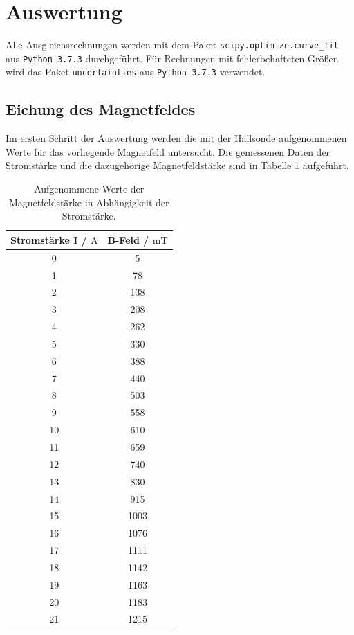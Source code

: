 \section{Auswertung}
Alle Ausgleichsrechnungen werden mit dem Paket \texttt{scipy.optimize.curve\_fit}  aus \texttt{Python 3.7.3} durchgeführt.
Für Rechnungen mit fehlerbehafteten Größen wird das Paket \texttt{uncertainties} aus \texttt{Python 3.7.3} verwendet.

\subsection{Eichung des Magnetfeldes}
Im ersten Schritt der Auswertung werden die mit der Hallsonde aufgenommenen Werte für das
vorliegende Magnetfeld untersucht. Die gemessenen Daten der Stromstärke und die dazugehörige
Magnetfeldstärke sind in Tabelle \ref{Tab:Messwerte} aufgeführt.
\begin{table}[H]
    \centering
    \caption{Aufgenommene Werte der Magnetfeldstärke in Abhängigkeit der Stromstärke.}
    \label{Tab:Messwerte}
    \begin{tabular}{cc}
      \toprule
      Stromstärke I / $\si{\ampere}$ & B-Feld / $\si{\milli\tesla}$  \\
      \midrule
      0 &    5 \\
      1 &   78 \\
      2 &  138 \\
      3 &  208 \\
      4 &  262 \\
      5 &  330 \\
      6 &  388 \\
      7 &  440 \\
      8 &  503 \\
      9 &  558 \\
     10 &  610 \\
     11 &  659 \\
     12 &  740 \\
     13 &  830 \\
     14 &  915 \\
     15 & 1003 \\
     16 & 1076 \\
     17 & 1111 \\
     18 & 1142 \\
     19 & 1163 \\
     20 & 1183 \\
     21 & 1215 \\
      \bottomrule
  \end{tabular}
 \end{table} \noindent
